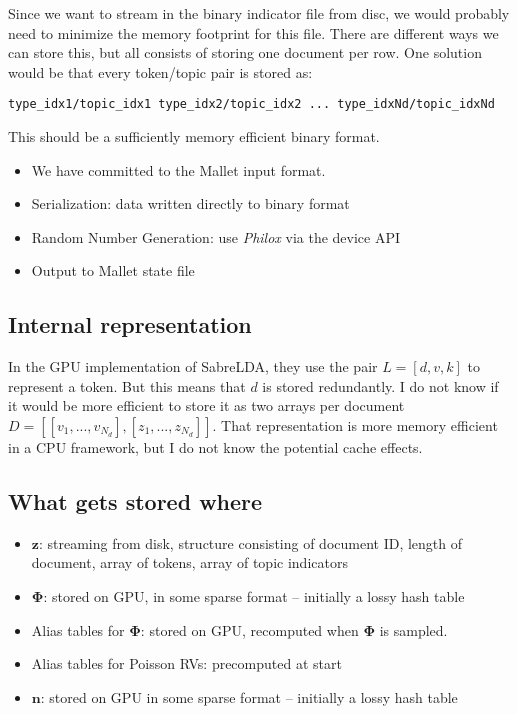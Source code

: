 \documentclass{article}
\newcommand{\m}{\expandafter\mathbf} %
\begin{document}
Since we want to stream in the binary indicator file from disc, we would probably need to minimize the memory footprint for this file. There are different ways we can store this, but all consists of storing one document per row. One solution would be that every token/topic pair is stored as:

\bigskip

\texttt{type\_idx1/topic\_idx1 type\_idx2/topic\_idx2 ... type\_idxNd/topic\_idxNd}

\bigskip

This should be a sufficiently memory efficient binary format.

\begin{itemize}
\item We have committed to the Mallet input format.
\item Serialization: data written directly to binary format
\item Random Number Generation: use \emph{Philox} via the device API
\item Output to Mallet state file
\end{itemize}

\subsection{Internal representation}

In the GPU implementation of SabreLDA, they use the pair $L = [d, v, k]$ to represent a token. But this means that $d$ is stored redundantly. I do not know if it would be more efficient to store it as two arrays per document $D = [[v_1, ..., v_{N_d}], [z_1, ..., z_{N_d}]]$. That representation is more memory efficient in a CPU framework, but I do not know the potential cache effects.

\subsection{What gets stored where}
\begin{itemize}
\item $\m{z}$: streaming from disk, structure consisting of document ID, length of document, array of tokens, array of topic indicators
\item $\m\Phi$: stored on GPU, in some sparse format -- initially a lossy hash table
\item Alias tables for $\m\Phi$: stored on GPU, recomputed when $\m\Phi$ is sampled.
\item Alias tables for Poisson RVs: precomputed at start
\item $\m{n}$: stored on GPU in some sparse format -- initially a lossy hash table
\end{itemize}
\end{document}
